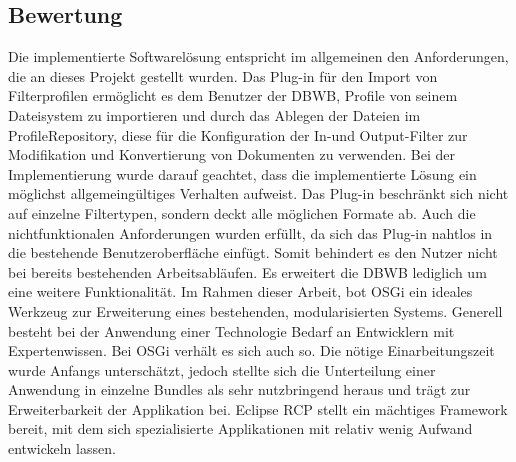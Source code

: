 {{{{\subsection{Bewertung}{
\label{sec:bewertung}
Die implementierte Softwarelösung entspricht im allgemeinen den Anforderungen, die an dieses Projekt gestellt wurden. Das Plug-in für den Import von Filterprofilen ermöglicht es dem Benutzer der \ac{DBWB}, Profile von seinem Dateisystem zu importieren und durch das Ablegen der Dateien im ProfileRepository, diese für die Konfiguration der In-und Output-Filter zur Modifikation und Konvertierung von Dokumenten zu verwenden. Bei der Implementierung wurde darauf geachtet, dass die implementierte Lösung ein möglichst allgemeingültiges Verhalten aufweist. Das Plug-in beschränkt sich nicht auf einzelne Filtertypen, sondern deckt alle möglichen Formate ab. Auch die nichtfunktionalen Anforderungen wurden erfüllt, da sich das Plug-in nahtlos in die bestehende Benutzeroberfläche einfügt. Somit behindert es den Nutzer nicht bei bereits bestehenden Arbeitsabläufen. Es erweitert die \ac {DBWB} lediglich um eine weitere Funktionalität. Im Rahmen dieser Arbeit, bot \ac{OSGi} ein ideales Werkzeug zur Erweiterung eines bestehenden, modularisierten Systems. Generell besteht bei der Anwendung einer Technologie Bedarf an Entwicklern mit Expertenwissen. Bei \ac{OSGi} verhält es sich auch so. Die nötige Einarbeitungszeit wurde Anfangs unterschätzt, jedoch stellte sich die Unterteilung einer Anwendung in einzelne Bundles als sehr nutzbringend heraus und trägt zur Erweiterbarkeit der Applikation bei. Eclipse \ac{RCP} stellt ein mächtiges Framework bereit, mit dem sich spezialisierte Applikationen mit relativ wenig Aufwand entwickeln lassen.
} 



}
}}}
